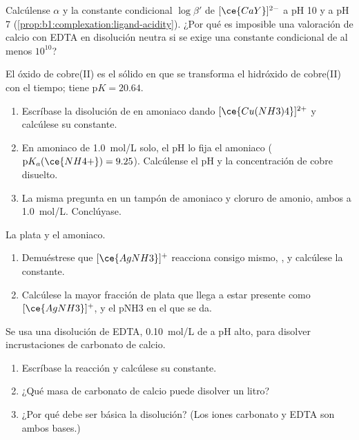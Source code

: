 \begin{exercise}[$\star\star$]\label{exo:b1:complexation:9}
Calcúlense $\alpha$ y la constante condicional $\log\beta'$ de
$[\ce{CaY}]^{2-}$ a pH 10 y a pH 7
(\cref{prop:b1:complexation:ligand-acidity}). ¿Por qué es imposible una
valoración de calcio con EDTA en disolución neutra si se exige una
constante condicional de al menos $10^{10}$?
\end{exercise}

\begin{exercise}[$\star\star\star$]\label{exo:b1:complexation:10}
El óxido de cobre(II)  es el sólido en que se transforma el
hidróxido de cobre(II) con el tiempo; 
tiene $\mathrm{p}K = 20.64$.
\begin{enumerate}
  \item Escríbase la disolución de  en amoniaco dando
        $[\ce{Cu(NH3)4}]^{2+}$ y calcúlese su constante.
  \item En amoniaco de \qty{1.0}{mol/L} solo, el pH lo fija el amoniaco
        ($\mathrm{p}K_a(\ce{NH4+}) = 9.25$). Calcúlense el pH y la
        concentración de cobre disuelto.
  \item La misma pregunta en un tampón de amoniaco y cloruro de amonio,
        ambos a \qty{1.0}{mol/L}. Conclúyase.
\end{enumerate}
\end{exercise}

\begin{exercise}[$\star\star\star$]\label{exo:b1:complexation:11}
La plata y el amoniaco.
\begin{enumerate}
  \item Demuéstrese que $[\ce{AgNH3}]^{+}$ reacciona consigo mismo,
        , y calcúlese la constante.
  \item Calcúlese la mayor fracción de plata que llega a estar presente
        como $[\ce{AgNH3}]^{+}$, y el pNH3 en el que se da.
\end{enumerate}
\end{exercise}

\begin{exercise}[$\star\star\star$]\label{exo:b1:complexation:12}
Se usa una disolución de EDTA, \qty{0.10}{mol/L} de  a pH alto,
para disolver incrustaciones de carbonato de calcio.
\begin{enumerate}
  \item Escríbase la reacción y calcúlese su constante.
  \item ¿Qué masa de carbonato de calcio puede disolver un litro?
  \item ¿Por qué debe ser básica la disolución? (Los iones carbonato y
        EDTA son ambos bases.)
\end{enumerate}
\end{exercise}

